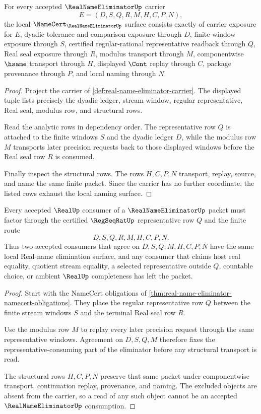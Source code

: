 \begin{theorem}
\label{thm:real-name-eliminator-namecert-obligations}
For every accepted $\RealNameEliminatorUp$ carrier
$$
E=(D,S,Q,R,M,H,C,P,N),
$$
the local $\NameCert_{\RealNameEliminatorUp}$ surface consists exactly of carrier exposure for $E$, dyadic tolerance and comparison exposure through $D$, finite window exposure through $S$, certified regular-rational representative readback through $Q$, Real seal exposure through $R$, modulus transport through $M$, componentwise $\hsame$ transport through $H$, displayed $\Cont$ replay through $C$, package provenance through $P$, and local naming through $N$.
\end{theorem}
\begin{proof}
Project the carrier of \autoref{def:real-name-eliminator-carrier}. The displayed tuple lists precisely the dyadic ledger, stream window, regular representative, Real seal, modulus row, and structural rows.

Read the analytic rows in dependency order. The representative row $Q$ is attached to the finite windows $S$ and the dyadic ledger $D$, while the modulus row $M$ transports later precision requests back to those displayed windows before the Real seal row $R$ is consumed.

Finally inspect the structural rows. The rows $H,C,P,N$ transport, replay, source, and name the same finite packet. Since the carrier has no further coordinate, the listed rows exhaust the local naming surface.
\end{proof}

\begin{theorem}
\label{thm:real-name-eliminator-regseqrat-determinacy}
Every accepted $\RealUp$ consumer of a $\RealNameEliminatorUp$ packet must factor through the certified $\RegSeqRatUp$ representative row $Q$ and the finite route
$$
D,S,Q,R,M,H,C,P,N.
$$
Thus two accepted consumers that agree on $D,S,Q,M,H,C,P,N$ have the same local Real-name elimination surface, and any consumer that claims host real equality, quotient stream equality, a selected representative outside $Q$, countable choice, or ambient $\RealUp$ completeness has left the packet.
\end{theorem}
\begin{proof}
Start with the NameCert obligations of \autoref{thm:real-name-eliminator-namecert-obligations}. They place the regular representative row $Q$ between the finite stream windows $S$ and the terminal Real seal row $R$.

Use the modulus row $M$ to replay every later precision request through the same representative windows. Agreement on $D,S,Q,M$ therefore fixes the representative-consuming part of the eliminator before any structural transport is read.

The structural rows $H,C,P,N$ preserve that same packet under componentwise transport, continuation replay, provenance, and naming. The excluded objects are absent from the carrier, so a read of any such object cannot be an accepted $\RealNameEliminatorUp$ consumption.
\end{proof}

